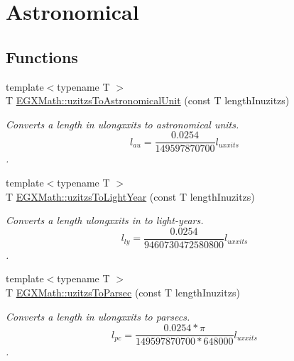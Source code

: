\hypertarget{group___e_g_x_math-_conversions-_length_conversions-_imperial-uzitzs-_astronomical}{}\section{Astronomical}
\label{group___e_g_x_math-_conversions-_length_conversions-_imperial-uzitzs-_astronomical}
\subsection*{Functions}
\begin{DoxyCompactItemize}
\item 
{\footnotesize template$<$typename T $>$ }\\T \mbox{\hyperlink{group___e_g_x_math-_conversions-_length_conversions-_imperial-uzitzs-_astronomical_ga5b92a4634ad3e80173c05bc3ff39f079}{E\+G\+X\+Math\+::uzitzs\+To\+Astronomical\+Unit}} (const T length\+Inuzitzs)
\begin{DoxyCompactList}\small\item\em Converts a length in ulongxxits to astronomical units. \[ l_{au}= \frac{0.0254}{149597870700} l_{uxxits} \]. \end{DoxyCompactList}\item 
{\footnotesize template$<$typename T $>$ }\\T \mbox{\hyperlink{group___e_g_x_math-_conversions-_length_conversions-_imperial-uzitzs-_astronomical_gaa6ada41d9c8a7516cb5fe8ab01976b27}{E\+G\+X\+Math\+::uzitzs\+To\+Light\+Year}} (const T length\+Inuzitzs)
\begin{DoxyCompactList}\small\item\em Converts a length ulongxxits in to light-\/years. \[ l_{ly}= \frac{0.0254}{9460730472580800} l_{uxxits} \]. \end{DoxyCompactList}\item 
{\footnotesize template$<$typename T $>$ }\\T \mbox{\hyperlink{group___e_g_x_math-_conversions-_length_conversions-_imperial-uzitzs-_astronomical_ga028a17a589e3f3d0c09daa6fbe664989}{E\+G\+X\+Math\+::uzitzs\+To\+Parsec}} (const T length\+Inuzitzs)
\begin{DoxyCompactList}\small\item\em Converts a length in ulongxxits to parsecs. \[ l_{pc}=\frac{0.0254 * \pi}{149597870700 * 648000} l_{uxxits} \]. \end{DoxyCompactList}\end{DoxyCompactItemize}


